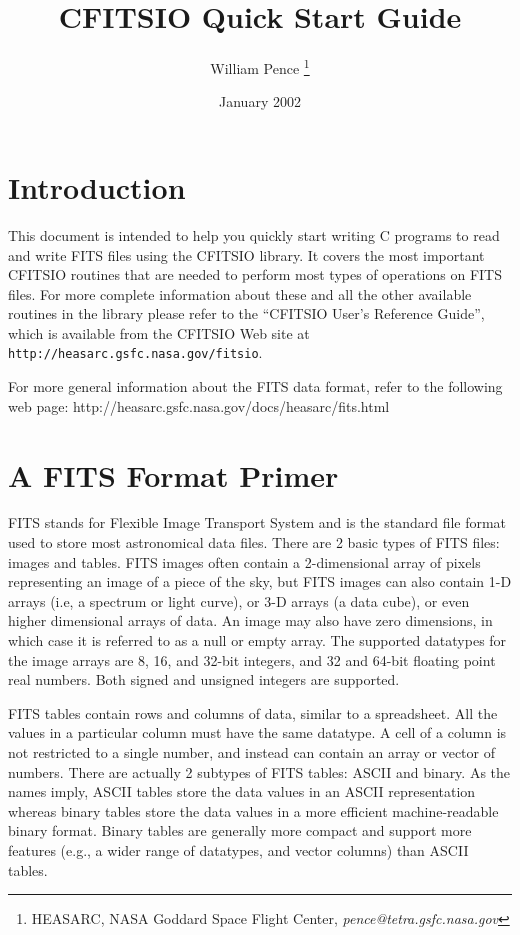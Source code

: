 \documentclass[11pt]{article}
\title{CFITSIO Quick Start Guide}
\author{William Pence \thanks{HEASARC, NASA Goddard Space Flight Center,
{\it pence@tetra.gsfc.nasa.gov}}}
\date{January 2002}
\begin{document}
\maketitle
\tableofcontents

\section{Introduction}

This document is intended to help you quickly start writing C programs
to read and write FITS files using the CFITSIO library.  It covers the
most important CFITSIO routines that are needed to perform most types
of operations on FITS files. For more complete information about these
and all the other available routines in the library please refer to
the  ``CFITSIO User's Reference Guide'', which is available from the
CFITSIO Web site at {\tt http://heasarc.gsfc.nasa.gov/fitsio}.

For more general information about the FITS data format, refer to the
following web page:
http://heasarc.gsfc.nasa.gov/docs/heasarc/fits.html
\section{A FITS Format Primer}

FITS stands for Flexible Image Transport System and is the standard
file format used to store most astronomical data files.  There are 2
basic types of FITS files: images and tables.  FITS images often
contain a 2-dimensional array of pixels representing an image of a
piece of the sky, but  FITS images can also contain 1-D arrays (i.e,
a spectrum or light curve), or  3-D arrays (a data cube), or
even higher dimensional arrays of data.   An image may also have zero
dimensions, in which case it is referred to as a null or empty array.
The supported datatypes for the image arrays are 8, 16, and 32-bit
integers, and 32 and 64-bit floating point real numbers.  Both signed
and unsigned integers are supported.

FITS tables contain rows and columns of data, similar to a
spreadsheet.  All the values in a particular column must have the same
datatype.  A cell of a column is not restricted to a single number, and
instead can contain an array or vector of numbers.  There are actually
2 subtypes of FITS tables: ASCII and binary. As the names imply,  ASCII
tables store the data values in an ASCII representation whereas binary
tables store the data values in a more efficient machine-readable
binary format.  Binary tables are generally more compact and support
more features (e.g., a wider range of datatypes, and vector columns)
than ASCII tables.
\end{document}
